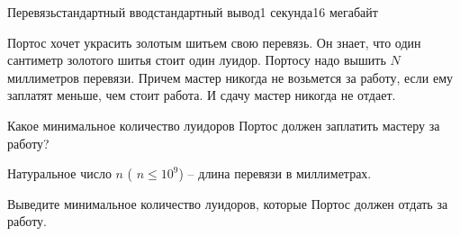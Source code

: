 \begin{problem}{Перевязь}{стандартный ввод}{стандартный вывод}{1 секунда}{16 мегабайт}

Портос хочет украсить золотым шитьем свою перевязь. Он знает, что один сантиметр золотого шитья стоит один луидор. Портосу надо вышить $N$ миллиметров перевязи. Причем мастер никогда не возьмется за работу, если ему заплатят меньше, чем стоит работа. И сдачу мастер никогда не отдает.

Какое минимальное количество луидоров Портос должен заплатить мастеру за работу?

\InputFile
Натуральное число $n$ ( $n \leq 10^9$) -- длина перевязи в миллиметрах.

\OutputFile
Выведите минимальное количество луидоров, которые Портос должен отдать за работу.

\Examples

\begin{example}
%
%
\end{example}

\end{problem}

